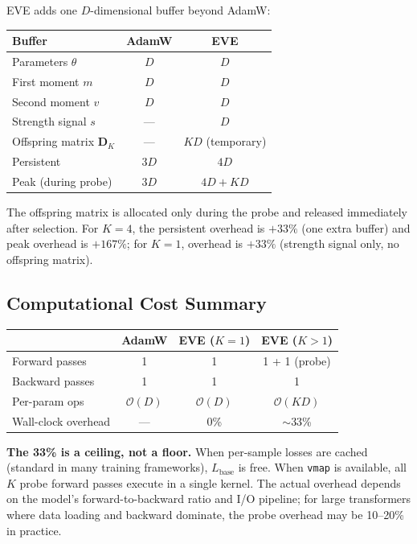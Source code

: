\documentclass[12pt]{article}
\newcommand{\notebox}[1]{%
  \begin{tcolorbox}[notestyle]
    #1
  \end{tcolorbox}
}
\begin{document}
EVE adds one $D$-dimensional buffer beyond AdamW:

\medskip
\begin{center}
\small
\begin{tabular}{@{}lcc@{}}
  \toprule
  Buffer & AdamW & EVE \\
  \midrule
  Parameters $\theta$ & $D$ & $D$ \\
  First moment $m$ & $D$ & $D$ \\
  Second moment $v$ & $D$ & $D$ \\
  Strength signal $s$ & --- & $D$ \\
  Offspring matrix $\mathbf{D}_K$ & --- & $KD$ (temporary) \\
  \midrule
  Persistent & $3D$ & $4D$ \\
  Peak (during probe) & $3D$ & $4D + KD$ \\
  \bottomrule
\end{tabular}
\end{center}

\medskip
The offspring matrix is allocated only during the probe and released
immediately after selection.
For $K = 4$, the persistent overhead is $+33\%$ (one extra buffer)
and peak overhead is $+167\%$; for $K = 1$, overhead is $+33\%$
(strength signal only, no offspring matrix).

\subsection{Computational Cost Summary}

\begin{center}
\small
\begin{tabular}{@{}lccc@{}}
  \toprule
  & AdamW & EVE ($K = 1$) & EVE ($K > 1$) \\
  \midrule
  Forward passes & 1 & 1 & 1 + 1 (probe) \\
  Backward passes & 1 & 1 & 1 \\
  Per-param ops & $\mathcal{O}(D)$ & $\mathcal{O}(D)$
    & $\mathcal{O}(KD)$ \\
  Wall-clock overhead & --- & 0\% & $\sim$33\% \\
  \bottomrule
\end{tabular}
\end{center}

\notebox{%
\textbf{The 33\% is a ceiling, not a floor.}
When per-sample losses are cached (standard in many training frameworks),
$L_{\mathrm{base}}$ is free.
When \texttt{vmap} is available, all $K$ probe forward passes execute
in a single kernel.
The actual overhead depends on the model's forward-to-backward ratio
and I/O pipeline; for large transformers where data loading and backward
dominate, the probe overhead may be 10--20\% in practice.
}
\end{document}
